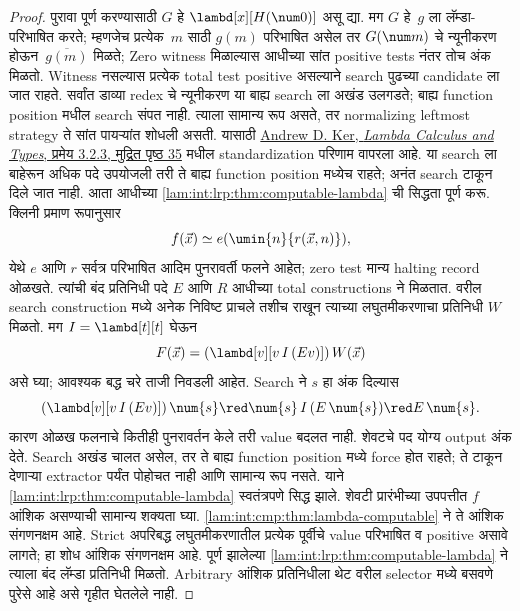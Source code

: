 \begin{proof}
पुरावा पूर्ण करण्यासाठी $G$ हे
$\lambd[x][H(\num 0)]$ असू द्या. मग $G$
हे~$g$ ला लॅम्डा-परिभाषित करते; म्हणजेच प्रत्येक~$m$
साठी $g(m)$ परिभाषित असेल तर $G(\num m)$ चे
न्यूनीकरण होऊन~$\overline {g(m)}$ मिळते;
Zero witness मिळाल्यास आधीच्या सांत positive tests नंतर
तोच अंक मिळतो. Witness नसल्यास प्रत्येक total test
positive असल्याने search पुढच्या candidate ला जात राहते.
सर्वांत डाव्या redex चे न्यूनीकरण या बाह्य search ला अखंड
उलगडते; बाह्य function position मधील search संपत नाही.
त्याला सामान्य रूप असते, तर normalizing leftmost strategy
ते सांत पायऱ्यांत शोधली असती. यासाठी
\href{https://www.cs.ox.ac.uk/andrew.ker/docs/lambdacalculus-lecture-notes-ht2009.pdf}{Andrew D. Ker, \emph{Lambda Calculus and Types}, प्रमेय 3.2.3,
मुद्रित पृष्ठ 35} मधील standardization परिणाम वापरला आहे.
या search ला बाहेरून अधिक पदे उपयोजली तरी ते बाह्य
function position मध्येच राहते; अनंत search टाकून दिले जात नाही.
आता आधीच्या \ref{lam:int:lrp:thm:computable-lambda} ची सिद्धता
पूर्ण करू. क्लिनी प्रमाण रूपानुसार
\[ f(\vec x)\simeq e(\umin{n}{r(\vec x,n)}),
\]
येथे $e$ आणि $r$ सर्वत्र परिभाषित आदिम पुनरावर्ती फलने
आहेत; zero test मान्य halting record ओळखते. त्यांची बंद
प्रतिनिधी पदे $E$ आणि $R$ आधीच्या total constructions ने
मिळतात. वरील search construction मध्ये अनेक निविष्ट प्राचले
तशीच राखून त्याच्या लघुतमीकरणाचा प्रतिनिधी $W$ मिळतो.
मग $I=\lambd[t][t]$ घेऊन
\[ F(\vec x)=(\lambd[v][v\,I\,(E v)])\,W(\vec x)
\]
असे घ्या; आवश्यक बद्ध चरे ताजी निवडली आहेत. Search
ने $s$ हा अंक दिल्यास
\[ (\lambd[v][v\,I\,(E v)])\,\num{s}
 \red \num{s}\,I\,(E\,\num{s})
 \red E\,\num{s}.
\]
कारण ओळख फलनाचे कितीही पुनरावर्तन केले तरी value बदलत
नाही. शेवटचे पद योग्य output अंक देते. Search अखंड चालत
असेल, तर ते बाह्य function position मध्ये force होत राहते;
ते टाकून देणाऱ्या extractor पर्यंत पोहोचत नाही आणि सामान्य
रूप नसते. याने \ref{lam:int:lrp:thm:computable-lambda} स्वतंत्रपणे
सिद्ध झाले.
शेवटी प्रारंभीच्या उपपत्तीत $f$ आंशिक असण्याची सामान्य
शक्यता घ्या. \ref{lam:int:cmp:thm:lambda-computable} ने ते आंशिक
संगणनक्षम आहे. Strict अपरिबद्ध लघुतमीकरणातील प्रत्येक
पूर्वीचे value परिभाषित व positive असावे लागते; हा शोध
आंशिक संगणनक्षम आहे. पूर्ण झालेल्या
\ref{lam:int:lrp:thm:computable-lambda} ने त्याला बंद लॅम्डा
प्रतिनिधी मिळतो. Arbitrary आंशिक प्रतिनिधीला थेट वरील
selector मध्ये बसवणे पुरेसे आहे असे गृहीत घेतलेले नाही.
\end{proof}



